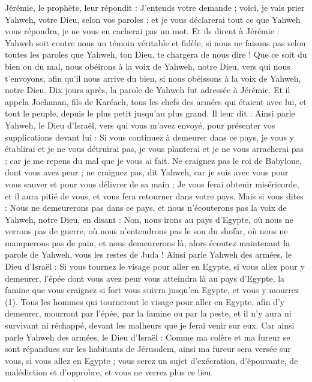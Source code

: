 \begin{multicols}{2}
Jérémie, le prophète, leur répondit : J'entends votre demande ; voici, je vais prier Yahweh, votre Dieu, selon vos paroles ; et je vous déclarerai tout ce que Yahweh vous répondra, je ne vous en cacherai pas un mot.
Et ils dirent à Jérémie : Yahweh soit contre nous un témoin véritable et fidèle, si nous ne faisons pas selon toutes les paroles que Yahweh, ton Dieu, te chargera de nous dire !
Que ce soit du bien ou du mal, nous obéirons à la voix de Yahweh, notre Dieu, vers qui nous t'envoyons, afin qu'il nous arrive du bien, si nous obéissons à la voix de Yahweh, notre Dieu.
Dix jours après, la parole de Yahweh fut adressée à Jérémie.
Et il appela Jochanan, fils de Karéach, tous les chefs des armées qui étaient avec lui, et tout le peuple, depuis le plus petit jusqu'au plus grand.
Il leur dit : Ainsi parle Yahweh, le Dieu d'Israël, vers qui vous m'avez envoyé, pour présenter vos supplications devant lui :
Si vous continuez à demeurer dans ce pays, je vous y établirai et je ne vous détruirai pas, je vous planterai et je ne vous arracherai pas ; car je me repens du mal que je vous ai fait.
Ne craignez pas le roi de Babylone, dont vous avez peur ; ne craignez pas, dit Yahweh, car je suis avec vous pour vous sauver et pour vous délivrer de sa main ;
Je vous ferai obtenir miséricorde, et il aura pitié de vous, et vous fera retourner dans votre pays.
Mais si vous dites : Nous ne demeurerons pas dans ce pays, et nous n'écouterons pas la voix de Yahweh, notre Dieu,
en disant : Non, nous irons au pays d'Egypte, où nous ne verrons pas de guerre, où nous n'entendrons pas le son du shofar, où nous ne manquerons pas de pain, et nous demeurerons là,
alors écoutez maintenant la parole de Yahweh, vous les restes de Juda ! Ainsi parle Yahweh des armées, le Dieu d'Israël : Si vous tournez le visage pour aller en Egypte, si vous allez pour y demeurer,
l'épée dont vous avez peur vous atteindra là au pays d'Egypte, la famine que vous craignez si fort vous suivra jusqu’en Egypte, et vous y mourrez\FTNT{} (1).
Tous les hommes qui tourneront le visage pour aller en Egypte, afin d'y demeurer, mourront par l'épée, par la famine ou par la peste, et il n’y aura ni survivant ni réchappé, devant les malheurs que je ferai venir sur eux.
Car ainsi parle Yahweh des armées, le Dieu d'Israël : Comme ma colère et ma fureur se sont répandues sur les habitants de Jérusalem, ainsi ma fureur sera versée sur vous, si vous allez en Egypte ; vous serez un sujet d’exécration, d’épouvante, de malédiction et d’opprobre, et vous ne verrez plus ce lieu.

\end{multicols}
